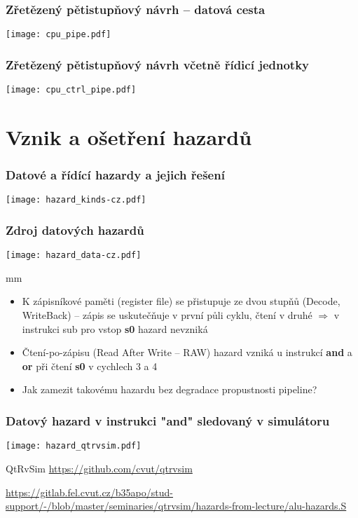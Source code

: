 \documentclass{beamer}
\begin{document}
\begin{frame}
\frametitle{Zřetězený pětistupňový návrh -- datová cesta}
\texttt{[image: cpu\_pipe.pdf]}
\end{frame}

\begin{frame}
\frametitle{Zřetězený pětistupňový návrh včetně řídicí jednotky}
\texttt{[image: cpu\_ctrl\_pipe.pdf]}
\end{frame}

\section{Vznik a ošetření hazardů}

\begin{frame}
\frametitle{Datové a řídící hazardy a jejich řešení}
\texttt{[image: hazard\_kinds-cz.pdf]}
\end{frame}

\begin{frame}
\frametitle{Zdroj datových hazardů}
\texttt{[image: hazard\_data-cz.pdf]}

 mm

\begin{itemize}
 \item K zápisníkové paměti (register file) se přistupuje ze dvou stupňů (Decode, WriteBack) --
       zápis se uskutečňuje v první půli cyklu, čtení v druhé $\Rightarrow$ v instrukci sub pro vstop \textbf{s0} hazard nevzniká
 \item Čtení-po-zápisu (Read After Write -- RAW) hazard vzniká u instrukcí
       \textbf{and} a \textbf{or} při čtení \textbf{s0} v cychlech 3 a 4
 \item Jak zamezit takovému hazardu bez degradace propustnosti pipeline?
\end{itemize}

\end{frame}


\begin{frame}
\frametitle{Datový hazard v instrukci "and" sledovaný v simulátoru}
\texttt{[image: hazard\_qtrvsim.pdf]}

{\tiny
QtRvSim \url{https://github.com/cvut/qtrvsim}
}

{\Tiny
\url{https://gitlab.fel.cvut.cz/b35apo/stud-support/-/blob/master/seminaries/qtrvsim/hazards-from-lecture/alu-hazards.S}
}

\end{frame}
\end{document}
